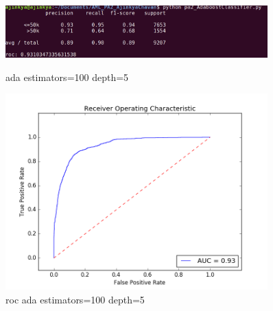 \documentclass{article}
\begin{document}
\begin{figure}
    \centering
    \begin{minipage}{0.45\textwidth}
        \centering
        \includegraphics[width=0.9\textwidth]{ada_100_5.png} %
        \caption{ada estimators=100 depth=5}
    \end{minipage}\hfill
    \begin{minipage}{0.45\textwidth}
        \centering
        \includegraphics[width=0.9\textwidth]{roc_ada_100_5.png} %
        \caption{roc ada estimators=100 depth=5}
    \end{minipage}
\end{figure}
\end{document}
